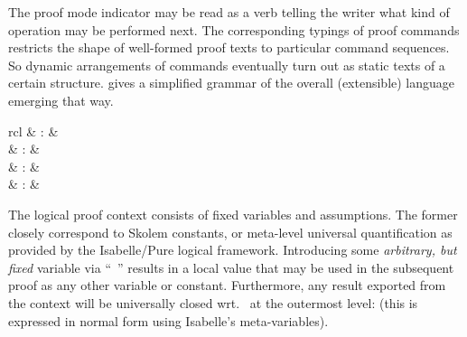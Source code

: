 \begin{isabellebody}
\begin{isamarkuptext}
  The proof mode indicator may be read as a verb telling the writer
  what kind of operation may be performed next.  The corresponding
  typings of proof commands restricts the shape of well-formed proof
  texts to particular command sequences.  So dynamic arrangements of
  commands eventually turn out as static texts of a certain structure.
   gives a simplified grammar of the overall
  (extensible) language emerging that way.%
\end{isamarkuptext}%
\isamarkuptrue%
%
\isamarkuptrue%
%
\begin{isamarkuptext}%
\begin{matharray}{rcl}
    \hypertarget{command.fix}{\hyperlink{command.fix}{\mbox{}}} & : &  \\
    \hypertarget{command.assume}{\hyperlink{command.assume}{\mbox{}}} & : &  \\
    \hypertarget{command.presume}{\hyperlink{command.presume}{\mbox{}}} & : &  \\
    \hypertarget{command.def}{\hyperlink{command.def}{\mbox{}}} & : &  \\
  \end{matharray}

  The logical proof context consists of fixed variables and
  assumptions.  The former closely correspond to Skolem constants, or
  meta-level universal quantification as provided by the Isabelle/Pure
  logical framework.  Introducing some \emph{arbitrary, but fixed}
  variable via ``\hyperlink{command.fix}{\mbox{}}~'' results in a local value
  that may be used in the subsequent proof as any other variable or
  constant.  Furthermore, any result  exported from
  the context will be universally closed wrt.\  at the
  outermost level:  (this is expressed in normal
  form using Isabelle's meta-variables).


\end{isamarkuptext}
\end{isabellebody}
